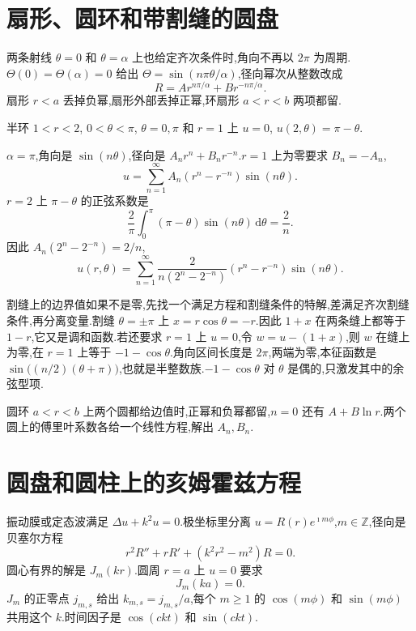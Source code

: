 \section{扇形、圆环和带割缝的圆盘}
两条射线 $\theta=0$ 和 $\theta=\alpha$ 上也给定齐次条件时,角向不再以 $2\pi$ 为周期.$\Theta(0)=\Theta(\alpha)=0$ 给出 $\Theta=\sin(n\pi\theta/\alpha)$,径向幂次从整数改成
\begin{equation}
  R=A r^{n\pi/\alpha}+B r^{-n\pi/\alpha}.
\end{equation}
扇形 $r<a$ 丢掉负幂,扇形外部丢掉正幂,环扇形 $a<r<b$ 两项都留.

\begin{example}
半环 $1<r<2$, $0<\theta<\pi$, $\theta=0,\pi$ 和 $r=1$ 上 $u=0$, $u(2,\theta)=\pi-\theta$.
\end{example}
\begin{solution}
$\alpha=\pi$,角向是 $\sin(n\theta)$,径向是 $A_n r^n+B_n r^{-n}$.$r=1$ 上为零要求 $B_n=-A_n$,
\begin{equation}
  u=\sum_{n=1}^{\infty}A_n(r^n-r^{-n})\sin(n\theta).
\end{equation}
$r=2$ 上 $\pi-\theta$ 的正弦系数是
\begin{equation}
  \frac{2}{\pi}\int_0^{\pi}(\pi-\theta)\sin(n\theta)\,\mathrm{d}\theta=\frac{2}{n}.
\end{equation}
因此 $A_n(2^n-2^{-n})=2/n$,
\begin{equation}
  u(r,\theta)=\sum_{n=1}^{\infty}
  \frac{2}{n(2^n-2^{-n})}(r^n-r^{-n})\sin(n\theta).
\end{equation}
\end{solution}

割缝上的边界值如果不是零,先找一个满足方程和割缝条件的特解,差满足齐次割缝条件,再分离变量.割缝 $\theta=\pm\pi$ 上 $x=r\cos\theta=-r$.因此 $1+x$ 在两条缝上都等于 $1-r$,它又是调和函数.若还要求 $r=1$ 上 $u=0$,令 $w=u-(1+x)$,则 $w$ 在缝上为零,在 $r=1$ 上等于 $-1-\cos\theta$.角向区间长度是 $2\pi$,两端为零,本征函数是 $\sin\bigl((n/2)(\theta+\pi)\bigr)$,也就是半整数族.$-1-\cos\theta$ 对 $\theta$ 是偶的,只激发其中的余弦型项.

圆环 $a<r<b$ 上两个圆都给边值时,正幂和负幂都留,$n=0$ 还有 $A+B\ln r$.两个圆上的傅里叶系数各给一个线性方程,解出 $A_n,B_n$.

\section{圆盘和圆柱上的亥姆霍兹方程}
振动膜或定态波满足 $\Delta u+k^2 u=0$.极坐标里分离 $u=R(r)e^{\imath m\phi}$,$m\in\mathbb{Z}$,径向是贝塞尔方程
\begin{equation}
  r^2 R''+r R'+(k^2 r^2-m^2)R=0.
\end{equation}
圆心有界的解是 $J_m(kr)$.圆周 $r=a$ 上 $u=0$ 要求
\begin{equation}
  J_m(ka)=0.
\end{equation}
$J_m$ 的正零点 $j_{m,s}$ 给出 $k_{m,s}=j_{m,s}/a$,每个 $m\geq 1$ 的 $\cos(m\phi)$ 和 $\sin(m\phi)$ 共用这个 $k$.时间因子是 $\cos(ckt)$ 和 $\sin(ckt)$.

